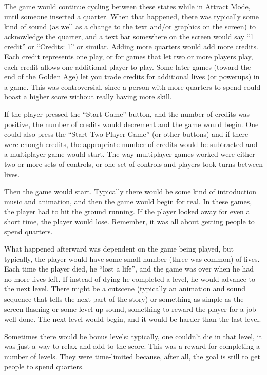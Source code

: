 \documentclass[12pt]{amsbook}
\theoremstyle{definition}
\theoremstyle{remark}
\numberwithin{figure}{chapter}
\numberwithin{table}{chapter}
\numberwithin{section}{chapter}
\numberwithin{equation}{section}
\begin{document}
The game would continue cycling between these states while in Attract Mode, until someone inserted a quarter.  When that happened, there was typically some kind of sound (as well as a change to the text and/or graphics on the screen) to acknowledge the quarter, and a text bar somewhere on the screen would say ``1 credit'' or ``Credits: 1'' or similar.  Adding more quarters would add more credits.  Each credit represents one play, or for games that let two or more players play, each credit allows one additional player to play.  Some later games (toward the end of the Golden Age) let you trade credits for additional lives (or powerups) in a game.  This was controversial, since a person with more quarters to spend could boast a higher score without really having more skill.

If the player pressed the ``Start Game'' button, and the number of credits was positive, the number of credits would decrement and the game would begin.  One could also press the ``Start Two Player Game'' (or other buttons) and if there were enough credits, the appropriate number of credits would be subtracted and a multiplayer game would start.  The way multiplayer games worked were either two or more sets of controls, or one set of controls and players took turns between lives.

Then the game would start.  Typically there would be some kind of introduction music and animation, and then the game would begin for real.  In these games, the player had to hit the ground running.  If the player looked away for even a short time, the player would lose.  Remember, it was all about getting people to spend quarters.

What happened afterward was dependent on the game being played, but typically, the player would have some small number (three was common) of lives.  Each time the player died, he ``lost a life'', and the game was over when he had no more lives left.  If instead of dying he completed a level, he would advance to the next level.  There might be a cutscene (typically an animation and sound sequence that tells the next part of the story) or something as simple as the screen flashing or some level-up sound, something to reward the player for a job well done.  The next level would begin, and it would be harder than the last level.

Sometimes there would be bonus levels: typically, one couldn't die in that level, it was just a way to relax and add to the score.  This was a reward for completing a number of levels.  They were time-limited because, after all, the goal is still to get people to spend quarters.
\end{document}
